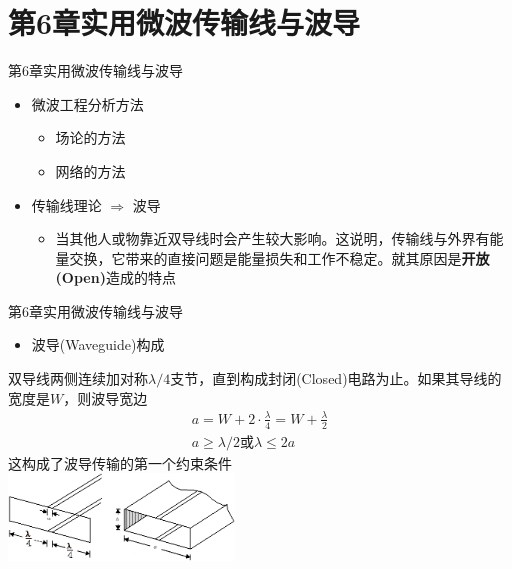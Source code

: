 \section{第6章\quad 实用微波传输线与波导}
\begin{frame}{第6章\quad 实用微波传输线与波导}
    \begin{itemize}
        \item 微波工程分析方法
              \begin{itemize}
                  \item 场论的方法
                  \item 网络的方法
              \end{itemize}
    \end{itemize}
    \begin{itemize}
        \item 传输线理论 $\Longrightarrow$ 波导
        \begin{itemize}
            \item 当其他人或物靠近双导线时会产生较大影响。这说明，传输线与外界有能量交换，它带来的直接问题是能量损失和工作不稳定。就其原因是\textbf{开放(Open)}造成的特点
        \end{itemize}
    \end{itemize}
\end{frame}

\begin{frame}{第6章\quad 实用微波传输线与波导}
    \begin{itemize}
        \item 波导(Waveguide)构成
    \end{itemize}
    双导线两侧连续加对称$\lambda/4$支节，直到构成封闭(Closed)电路为止。如果其导线的宽度是$W$，则波导宽边
    \begin{align*}
        a=W+2\cdot \frac{\lambda}{4}=W+\frac{\lambda}{2} \\
        a\geqslant \lambda/2 或 \lambda\leqslant 2a
    \end{align*}
    这构成了波导传输的第一个约束条件 \\
    \centering
    \includegraphics[width=6cm]{fig6-0.png}
\end{frame}

